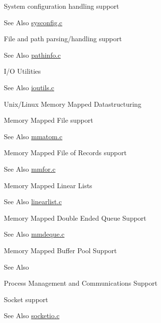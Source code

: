 \begin{DoxyItemize}
\begin{DoxyItemize}
\item System configuration handling support \begin{DoxySeeAlso}{See Also}
\hyperlink{sysconfig_8c}{sysconfig.\-c} 
\end{DoxySeeAlso}

\item File and path parsing/handling support \begin{DoxySeeAlso}{See Also}
\hyperlink{pathinfo_8c}{pathinfo.\-c} 
\end{DoxySeeAlso}

\item I/\-O Utilities \begin{DoxySeeAlso}{See Also}
\hyperlink{ioutils_8c}{ioutils.\-c} 
\end{DoxySeeAlso}

\end{DoxyItemize}
\item Unix/\-Linux Memory Mapped Datastructuring 
\begin{DoxyItemize}
\item Memory Mapped File support \begin{DoxySeeAlso}{See Also}
\hyperlink{mmatom_8c}{mmatom.\-c} 
\end{DoxySeeAlso}

\item Memory Mapped File of Records support \begin{DoxySeeAlso}{See Also}
\hyperlink{mmfor_8c}{mmfor.\-c} 
\end{DoxySeeAlso}

\item Memory Mapped Linear Lists \begin{DoxySeeAlso}{See Also}
\hyperlink{linearlist_8c}{linearlist.\-c} 
\end{DoxySeeAlso}

\item Memory Mapped Double Ended Queue Support \begin{DoxySeeAlso}{See Also}
\hyperlink{mmdeque_8c}{mmdeque.\-c} 
\end{DoxySeeAlso}

\item Memory Mapped Buffer Pool Support \begin{DoxySeeAlso}{See Also}

\end{DoxySeeAlso}

\end{DoxyItemize}
\item Process Management and Communications Support 
\begin{DoxyItemize}
\item Socket support \begin{DoxySeeAlso}{See Also}
\hyperlink{socketio_8c}{socketio.\-c} 
\end{DoxySeeAlso}


\end{DoxyItemize}
\end{DoxyItemize}
